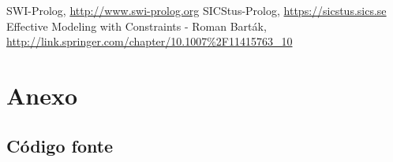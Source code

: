\documentclass{llncs}
\begin{document}
%
%
\pagebreak
\begin{thebibliography}{5}
%
SWI-Prolog,
\url{http://www.swi-prolog.org}
SICStus-Prolog,
\url{https://sicstus.sics.se}
Effective Modeling with Constraints - Roman Barták,
\url{http://link.springer.com/chapter/10.1007\%2F11415763\_10}

\end{thebibliography}

\appendix
\section*{Anexo}
\subsection*{Código fonte}
\end{document}

